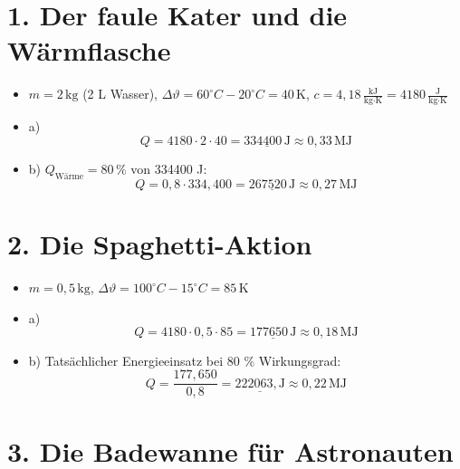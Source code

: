 \documentclass[a4paper]{article}
\begin{document}
	


\section*{1. Der faule Kater und die Wärmflasche}

\begin{itemize}
	\item \( m = 2\,\text{kg} \) (2 L Wasser),  
	\( \Delta \vartheta = 60^\circ C - 20^\circ C = 40\,\text{K} \),  
	\( c = 4{,}18\,\frac{\text{kJ}}{\text{kg}\cdot\text{K}} = 4180\,\frac{\text{J}}{\text{kg}\cdot\text{K}} \)
	
	\item a)  
	\[
	Q = 4180 \cdot 2 \cdot 40 = \underline{334400\,\text{J}}\approx 0,33 \,\text{MJ}
	\]
	
	\item b) \( Q_\text{Wärme} = 80\,\% \) von 334400 J:  
	\[
	Q = 0{,}8 \cdot 334{,}400 = \underline{267520\,\text{J}}\approx 0,27 \,\text{MJ}
	\]
\end{itemize}

\hrulefill

\section*{2. Die Spaghetti-Aktion}

\begin{itemize}
	\item \( m = 0{,}5\,\text{kg} \),  
	\( \Delta \vartheta = 100^\circ C - 15^\circ C = 85\,\text{K} \)
	
	\item a)  
	\[
	Q = 4180 \cdot 0{,}5 \cdot 85 = \underline{177650\,\text{J}}\approx 0,18\, \text{MJ}
	\]
	
	\item b) Tatsächlicher Energieeinsatz bei 80 \% Wirkungsgrad:  
	\[
	Q = \frac{177{,}650}{0{,}8} = \underline{222063,\text{J}}\approx 0,22 \,\text{MJ}
	\]
\end{itemize}

\hrulefill

\section*{3. Die Badewanne für Astronauten}
\end{document}
